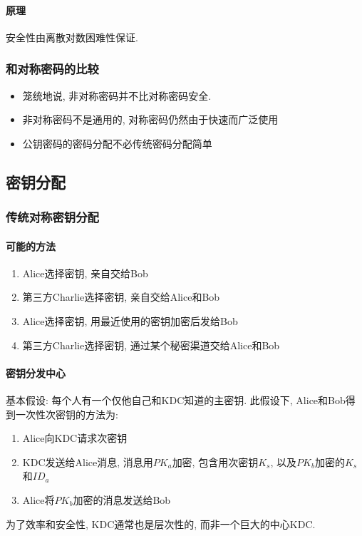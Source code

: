 \documentclass{ctexart}
\begin{document}
\paragraph{原理}
    安全性由离散对数困难性保证.
\subsubsection{和对称密码的比较}
    \begin{itemize}
        \item 笼统地说, 非对称密码并不比对称密码安全.
        \item 非对称密码不是通用的, 对称密码仍然由于快速而广泛使用
        \item 公钥密码的密码分配不必传统密码分配简单
    \end{itemize}

\subsection{密钥分配}
\subsubsection{传统对称密钥分配}
\paragraph{可能的方法}
    \begin{enumerate}
        \item Alice选择密钥, 亲自交给Bob
        \item 第三方Charlie选择密钥, 亲自交给Alice和Bob
        \item Alice选择密钥, 用最近使用的密钥加密后发给Bob
        \item 第三方Charlie选择密钥, 通过某个秘密渠道交给Alice和Bob
    \end{enumerate}
\paragraph{密钥分发中心}
    基本假设: 每个人有一个仅他自己和KDC知道的主密钥. 此假设下, Alice和Bob得到一次性次密钥的方法为:
    \begin{enumerate}
        \item Alice向KDC请求次密钥
        \item KDC发送给Alice消息, 消息用$PK_a$加密, 包含用次密钥$K_s$, 以及$PK_b$加密的$K_s$和$ID_a$
        \item Alice将$PK_b$加密的消息发送给Bob
    \end{enumerate}
    为了效率和安全性, KDC通常也是层次性的, 而非一个巨大的中心KDC.
\end{document}
